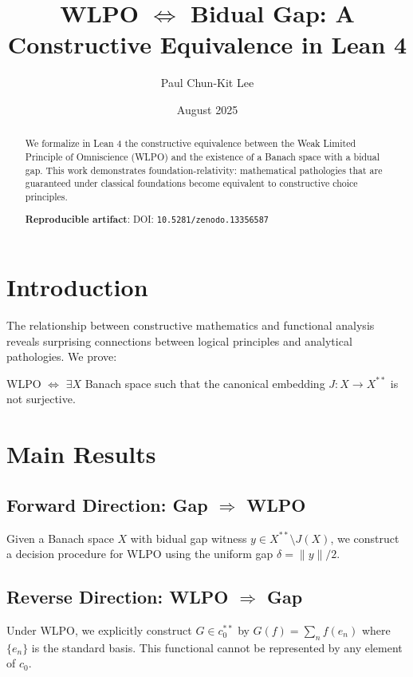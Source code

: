 \documentclass{article}
\title{WLPO $\Leftrightarrow$ Bidual Gap: A Constructive Equivalence in Lean 4}
\author{Paul Chun-Kit Lee}
\date{August 2025}
\begin{document}
\maketitle

\begin{abstract}
We formalize in Lean 4 the constructive equivalence between the Weak Limited Principle of Omniscience (WLPO) and the existence of a Banach space with a bidual gap. This work demonstrates foundation-relativity: mathematical pathologies that are guaranteed under classical foundations become equivalent to constructive choice principles.

\textbf{Reproducible artifact}: DOI: \texttt{10.5281/zenodo.13356587}
\end{abstract}

\section{Introduction}

The relationship between constructive mathematics and functional analysis reveals surprising connections between logical principles and analytical pathologies. We prove:

\begin{theorem}
WLPO $\Leftrightarrow$ $\exists X$ Banach space such that the canonical embedding $J: X \to X^{**}$ is not surjective.
\end{theorem}

\section{Main Results}

\subsection{Forward Direction: Gap $\Rightarrow$ WLPO}

Given a Banach space $X$ with bidual gap witness $y \in X^{**} \setminus J(X)$, we construct a decision procedure for WLPO using the uniform gap $\delta = \|y\|/2$.

\subsection{Reverse Direction: WLPO $\Rightarrow$ Gap}

Under WLPO, we explicitly construct $G \in c_0^{**}$ by $G(f) = \sum_n f(e_n)$ where $\{e_n\}$ is the standard basis. This functional cannot be represented by any element of $c_0$.
\end{document}
